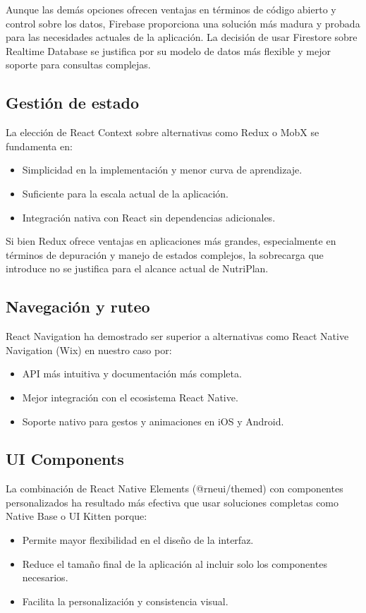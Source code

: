 \documentclass[twoside, openright, 11pt]{report}
\begin{document}
	Aunque las demás opciones ofrecen ventajas en términos de código abierto y control sobre los datos, Firebase proporciona una solución más madura y probada para las necesidades actuales de la aplicación. La decisión de usar Firestore sobre Realtime Database se justifica por su modelo de datos más flexible y mejor soporte para consultas complejas.
	
	\subsection*{Gestión de estado}
	La elección de React Context sobre alternativas como Redux o MobX se fundamenta en:
	\begin{itemize}
		\item Simplicidad en la implementación y menor curva de aprendizaje.
		\item Suficiente para la escala actual de la aplicación.
		\item Integración nativa con React sin dependencias adicionales.
	\end{itemize}
	
	Si bien Redux ofrece ventajas en aplicaciones más grandes, especialmente en términos de depuración y manejo de estados complejos, la sobrecarga que introduce no se justifica para el alcance actual de NutriPlan.
	
	\subsection*{Navegación y ruteo}
	React Navigation ha demostrado ser superior a alternativas como React Native Navigation (Wix) en nuestro caso por:
	\begin{itemize}
		\item API más intuitiva y documentación más completa.
		\item Mejor integración con el ecosistema React Native.
		\item Soporte nativo para gestos y animaciones en iOS y Android.
	\end{itemize}
	
	\subsection*{UI Components}
	La combinación de React Native Elements (@rneui/themed) con componentes personalizados ha resultado más efectiva que usar soluciones completas como Native Base o UI Kitten porque:
	\begin{itemize}
		\item Permite mayor flexibilidad en el diseño de la interfaz.
		\item Reduce el tamaño final de la aplicación al incluir solo los componentes necesarios.
		\item Facilita la personalización y consistencia visual.
	\end{itemize}
	
\end{document}
